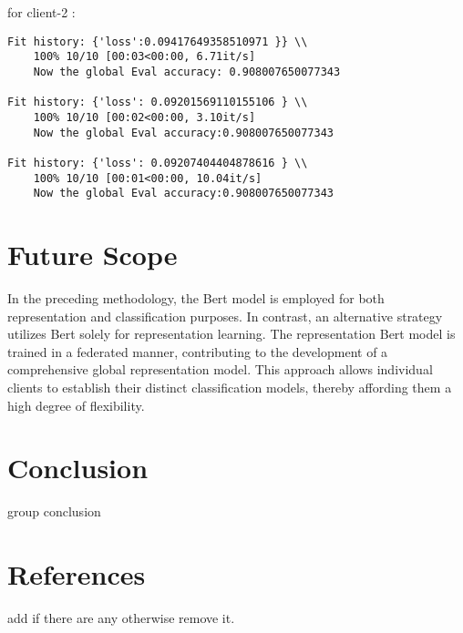 \documentclass[titlepage]{article}
\begin{document}
for client-2 : \\
	\begin{verbatim}
Fit history: {'loss':0.09417649358510971 }} \\
    100% 10/10 [00:03<00:00, 6.71it/s]
    Now the global Eval accuracy: 0.908007650077343

Fit history: {'loss': 0.09201569110155106 } \\
    100% 10/10 [00:02<00:00, 3.10it/s]
    Now the global Eval accuracy:0.908007650077343

Fit history: {'loss': 0.09207404404878616 } \\
    100% 10/10 [00:01<00:00, 10.04it/s]
    Now the global Eval accuracy:0.908007650077343
\end{verbatim}



\section{Future Scope}
In the preceding methodology, the Bert model is employed for both representation and classification purposes. In contrast, an alternative strategy utilizes Bert solely for representation learning. The representation Bert model is trained in a federated manner, contributing to the development of a comprehensive global representation model. This approach allows individual clients to establish their distinct classification models, thereby affording them a high degree of flexibility. 

\section{Conclusion}
group conclusion
\section{References}
add if there are any otherwise remove it.
\end{document}

